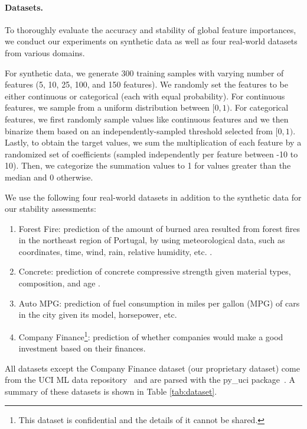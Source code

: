 \paragraph{Datasets.} To thoroughly evaluate the accuracy and stability of global feature importances, we conduct our experiments on synthetic data as well as four real-world datasets from various domains.

For synthetic data, we generate 300 training samples with varying number of features (5, 10, 25, 100, and 150 features). %
We randomly set the features to be either continuous or categorical (each with equal probability). For continuous features, we sample from a uniform distribution between $[0, 1)$. For categorical features, we first randomly sample values like continuous features and we then binarize them based on an independently-sampled threshold selected from $[0, 1)$. Lastly, to obtain the target values, we sum the multiplication of each feature by a randomized set of coefficients (sampled independently per feature between -10 to 10). Then, we categorize the summation values to 1 for values greater than the median and 0 otherwise. 

We use the following four real-world datasets in addition to the synthetic data for our stability assessments:
\begin{enumerate}
    \item Forest Fire: prediction of the amount of burned area resulted from forest fires in the northeast region of Portugal, by using meteorological data, such as coordinates, time, wind, rain, relative humidity, etc. \cite{cortez2007data}.
    \item Concrete: prediction of concrete compressive strength given material types, composition, and age \cite{yeh1998modeling}.
    \item Auto MPG: prediction of fuel consumption in miles per gallon (MPG) of cars in the city given its model, horsepower, etc. \cite{quinlan1993combining}
    \item Company Finance\footnote{This dataset is confidential and the details of it cannot be shared.}: prediction of whether companies would make a good investment based on their finances.
\end{enumerate}

All datasets except the Company Finance dataset (our proprietary dataset) come from the UCI ML data repository~\cite{Dua:2019} and are parsed with the py\_uci package~\cite{skafte_2019}. A summary of these datasets is shown in Table \ref{tab:dataset}. 
                        
